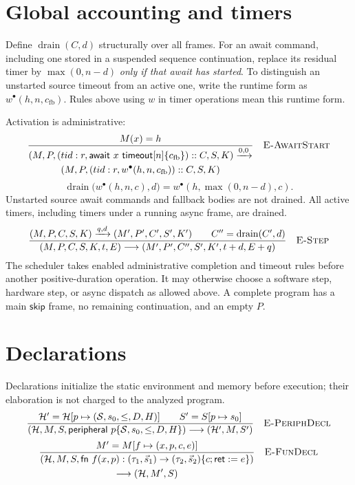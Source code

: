\documentclass[11pt]{article}
\newcommand{\kw}[1]{\mathsf{#1}}
\newcommand{\step}[2]{\xrightarrow{#1,#2}}
\newcommand{\rulelabel}[1]{\quad\textsc{#1}}
\newcommand{\frm}[3]{(#1:#2,#3)}
\begin{document}
\section{Global accounting and timers}
Define $\operatorname{drain}(C,d)$ structurally over all frames. For an await
command, including one stored in a suspended sequence continuation, replace
its residual timer by $\max(0,n-d)$ \emph{only if that await has started}.
To distinguish an unstarted source timeout from an active one, write the
runtime form as $w^{\bullet}(h,n,c_{\mathrm{fb}})$. Rules above using $w$ in
timer operations mean this runtime form.

Activation is administrative:
\[
\frac{M(x)=h}{
 \begin{gathered}
 (M,P,\frm{tid}{r}{\kw{await}\ x\ \kw{timeout}[n]\{c_{\mathrm{fb}}\}}::C,S,K)
 \step{0}{0}\\
 (M,P,\frm{tid}{r}{w^{\bullet}(h,n,c_{\mathrm{fb}})}::C,S,K)
 \end{gathered}
}\rulelabel{E-AwaitStart}
\]
\[
\operatorname{drain}\bigl(w^{\bullet}(h,n,c),d\bigr)
 =w^{\bullet}(h,\max(0,n-d),c).
\]
Unstarted source await commands and fallback bodies are not drained.
All active timers, including timers under a running async frame, are drained.
\[
\frac{
 (M,P,C,S,K)\step{q}{d}(M',P',C',S',K')
 \qquad C''=\operatorname{drain}(C',d)
}{
 (M,P,C,S,K,t,E)\longrightarrow
 (M',P',C'',S',K',t+d,E+q)
}\rulelabel{E-Step}
\]
The scheduler takes enabled administrative completion and timeout rules
before another positive-duration operation. It may otherwise choose a software
step, hardware step, or async dispatch as allowed above. A complete program
has a main $\kw{skip}$ frame, no remaining continuation, and an empty $P$.

\section{Declarations}
Declarations initialize the static environment and memory before execution;
their elaboration is not charged to the analyzed program.
\[
\frac{
 \mathcal H'=\mathcal H[p\mapsto(\mathcal S,s_0,\leq,D,H)]
 \qquad S'=S[p\mapsto s_0]
}{
 (\mathcal H,M,S,\kw{peripheral}\ p\{\mathcal S,s_0,\leq,D,H\})
 \longrightarrow(\mathcal H',M,S')
}\rulelabel{E-PeriphDecl}
\]
\[
\frac{M'=M[f\mapsto(x,p,c,e)]}{
 \begin{gathered}
 (\mathcal H,M,S,
 \kw{fn}\ f(x,p):(\tau_1,\vec s_1)\to(\tau_2,\vec s_2)
 \{c;\kw{ret}:=e\})\\
 \longrightarrow(\mathcal H,M',S)
 \end{gathered}
}\rulelabel{E-FunDecl}
\]
\end{document}
